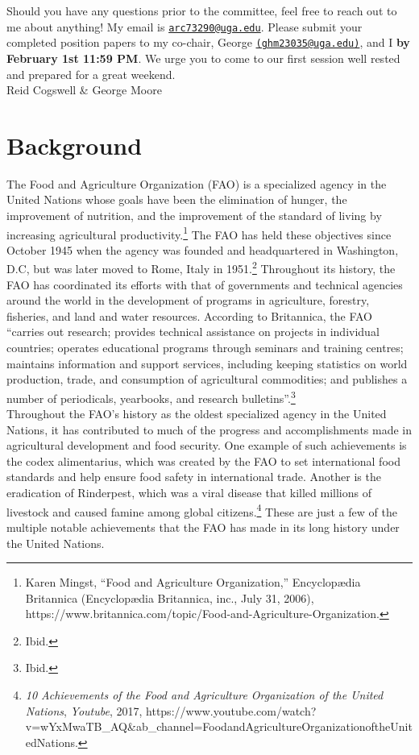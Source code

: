 \documentclass[10pt, letterpaper]{article}
\begin{document}
Should you have any questions prior to the committee, feel free to reach
out to me about anything! My email is \texttt{\href{mailto:arc73290@uga.edu}{arc73290@uga.edu}}. Please submit
your completed position papers to my co-chair, George
\texttt{\href{mailto:ghm23035@uga.edu}{(ghm23035@uga.edu)}}, and I \textbf{by February 1st 11:59 PM}. We urge you to come
to our first session well rested and prepared for a great weekend. \\

Reid Cogswell \& George Moore

\newpage
\tableofcontents
\newpage

\section{Background}

The Food and Agriculture Organization (FAO) is a specialized agency in
the United Nations whose goals have been the elimination of hunger, the
improvement of nutrition, and the improvement of the standard of living
by increasing agricultural productivity.\footnote{Karen Mingst, ``Food
  and Agriculture Organization,'' Encyclopædia Britannica (Encyclopædia
  Britannica, inc., July 31, 2006),
  https://www.britannica.com/topic/Food-and-Agriculture-Organization.}
The FAO has held these objectives since October 1945 when the agency was
founded and headquartered in Washington, D.C, but was later moved to
Rome, Italy in 1951.\footnote{Ibid.} Throughout its history, the FAO has
coordinated its efforts with that of governments and technical agencies
around the world in the development of programs in agriculture,
forestry, fisheries, and land and water resources. According to
Britannica, the FAO ``carries out research; provides technical
assistance on projects in individual countries; operates educational
programs through seminars and training centres; maintains information
and support services, including keeping statistics on world production,
trade, and consumption of agricultural commodities; and publishes a
number of periodicals, yearbooks, and research bulletins''.\footnote{Ibid.} \\

Throughout the FAO's history as the oldest specialized agency in the
United Nations, it has contributed to much of the progress and
accomplishments made in agricultural development and food security. One
example of such achievements is the codex alimentarius, which was
created by the FAO to set international food standards and help ensure
food safety in international trade. Another is the eradication of
Rinderpest, which was a viral disease that killed millions of livestock
and caused famine among global citizens.\footnote{\emph{10 Achievements
  of the Food and Agriculture Organization of the United Nations},
  \emph{Youtube}, 2017,
  https://www.youtube.com/watch?v=wYxMwaTB\_AQ\&ab\_channel=FoodandAgricultureOrganizationoftheUnitedNations.}
These are just a few of the multiple notable achievements that the FAO
has made in its long history under the United Nations. \\
\end{document}
